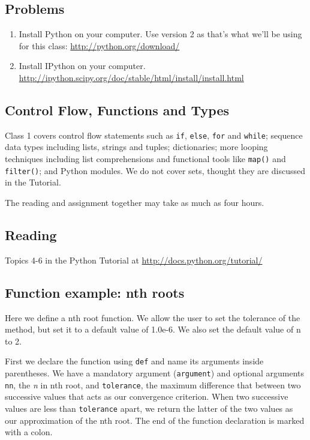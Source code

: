 \subsection{Problems}

\begin{enumerate}
  \item Install Python on your computer. Use version 2 as that's what we'll be using for this class: \url{http://python.org/download/}
  \item Install IPython on your computer. \url{http://ipython.scipy.org/doc/stable/html/install/install.html}
\end{enumerate}

\subsection{Control Flow, Functions and Types}
Class 1 covers control flow statements such as \verb|if|, \verb|else|, \verb|for| and \verb|while|; sequence data types including lists, strings and tuples; dictionaries; more looping techniques including list comprehensions and functional tools like \verb|map()| and \verb|filter()|; and Python modules. We do not cover sets, thought they are discussed in the Tutorial.

The reading and assignment together may take as much as four hours.

\subsection{Reading}
Topics 4-6 in the Python Tutorial at \url{http://docs.python.org/tutorial/} \cite{website:Python272docs}

\subsection{Function example: nth roots}
Here we define a nth root function.  We allow the user to set the tolerance of the method, but set it to a default value of 1.0e-6. We also set the default value of n to 2.

First we declare the function using \verb|def| and name its arguments inside parentheses. We have a mandatory argument (\verb|argument|) and optional arguments \verb|nn|, the \emph{n} in nth root, and \verb|tolerance|, the maximum difference that between two successive values that acts as our convergence criterion. When two successive values are less than \verb|tolerance| apart, we return the latter of the two values as our approximation of the nth root. The end of the function declaration is marked with a colon.

